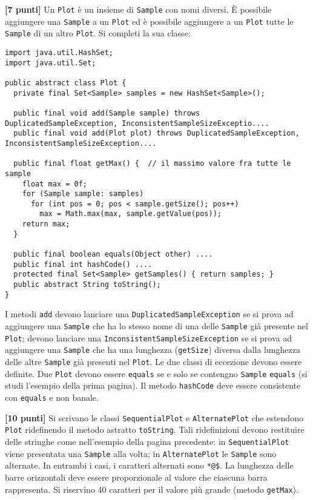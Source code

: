\documentclass{article}[10pt]
\newcounter{esnu}
\newenvironment{esercizio}{\medskip \noindent {\bf Esercizio\addtocounter{esnu}{1} \arabic{esnu}}}{}
\begin{document}
\begin{esercizio}
\textbf{[7 punti]}
Un \texttt{Plot} \`e un insieme di \texttt{Sample} con nomi diversi. \`E possibile
aggiungere una \texttt{Sample} a un \texttt{Plot} ed \`e possibile aggiungere a un \texttt{Plot} tutte le
\texttt{Sample} di un altro \texttt{Plot}. Si completi la sua classe:

{\small
\begin{verbatim}
import java.util.HashSet;
import java.util.Set;

public abstract class Plot {
  private final Set<Sample> samples = new HashSet<Sample>();

  public final void add(Sample sample) throws DuplicatedSampleException, InconsistentSampleSizeExceptio....
  public final void add(Plot plot) throws DuplicatedSampleException, InconsistentSampleSizeException....

  public final float getMax() {  // il massimo valore fra tutte le sample
    float max = 0f;
    for (Sample sample: samples)
      for (int pos = 0; pos < sample.getSize(); pos++)
        max = Math.max(max, sample.getValue(pos));
    return max;
  }

  public final boolean equals(Object other) ....
  public final int hashCode() ....
  protected final Set<Sample> getSamples() { return samples; }
  public abstract String toString();
}
\end{verbatim}}

\noindent
I metodi \texttt{add} devono lanciare una \texttt{DuplicatedSampleException} se si prova ad aggiungere
una \texttt{Sample} che ha lo stesso nome di una delle \texttt{Sample} gi\`a presente nel \texttt{Plot};
devono lanciare una \texttt{InconsistentSampleSizeException} se si prova ad aggiungere una \texttt{Sample}
che ha una lunghezza (\texttt{getSize}) diversa dalla lunghezza delle altre \texttt{Sample} gi\`a presenti
nel \texttt{Plot}. Le due classi di eccezione devono essere definite.
Due \texttt{Plot} devono essere \texttt{equals} se e solo se contengno \texttt{Sample} \texttt{equals} (si
studi l'esempio della prima pagina). Il metodo \texttt{hashCode} deve essere consistente con \texttt{equals}
e non banale.
\end{esercizio}

\begin{esercizio}
\textbf{[10 punti]}
Si scrivano le classi \texttt{SequentialPlot} e \texttt{AlternatePlot} che estendono
\texttt{Plot} ridefinendo il metodo astratto \texttt{toString}. Tali ridefinizioni devono restituire
delle stringhe come nell'esempio della pagina precedente: in \texttt{SequentialPlot}
viene presentata una \texttt{Sample} alla volta; in \texttt{AlternatePlot} le \texttt{Sample}
sono alternate. In entrambi i casi, i caratteri alternati sono \texttt{*@\$}. La lunghezza delle
barre orizzontali deve essere proporzionale al valore che ciascuna barra
rappresenta. Si riservino 40 caratteri per il valore pi\`u grande (metodo \texttt{getMax}).
\end{esercizio}
\end{document}
